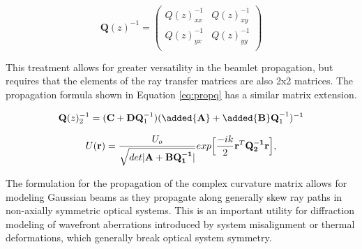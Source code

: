 \begin{equation}
    \textbf{Q}(z)^{-1} = 
    \begin{pmatrix}
    Q(z)_{xx}^{-1} & Q(z)_{xy}^{-1} \\
    Q(z)_{yx}^{-1} & Q(z)_{yy}^{-1} \\
    \end{pmatrix}
\end{equation}

This treatment allows for greater versatility in the beamlet propagation, but requires that the elements of the ray transfer matrices are also 2x2 matrices. The propagation formula shown in Equation \ref{eq:propq} has a similar matrix extension.

\begin{equation}
    \mathbf{Q}(z)_{2}^{-1} = (\mathbf{C} + \mathbf{DQ}^{-1}_{1})(\added{\mathbf{A}} + \mathbf{\added{B}Q}^{-1}_{1})^{-1}
    \label{eq:prop_complex}
\end{equation}

\begin{equation}
    U(\mathbf{r}) = \frac{U_{o}}{\sqrt{det|\mathbf{A} + \mathbf{BQ_{1}^{-1}}|}} exp\Bigl[\frac{-ik}{2} \mathbf{r}^{T} \mathbf{Q_{2}^{-1}} \mathbf{r}\Bigr],
    \label{eq:gaussian_prop}
\end{equation}

 The formulation for the propagation of the complex curvature matrix allows for modeling Gaussian beams as they propagate along generally skew ray paths in non-axially symmetric optical systems. This is an important utility for diffraction modeling of wavefront aberrations introduced by system misalignment or thermal deformations, which generally break optical system symmetry. 

